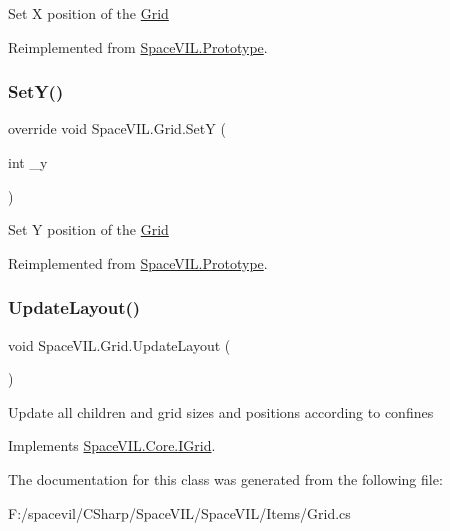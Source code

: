 Set X position of the \mbox{\hyperlink{class_space_v_i_l_1_1_grid}{Grid}} 



Reimplemented from \mbox{\hyperlink{class_space_v_i_l_1_1_prototype}{Space\+V\+I\+L.\+Prototype}}.

\mbox{\label{class_space_v_i_l_1_1_grid_a37ea23fcafda8c5fd8cc8fc41101a20d}} 
\subsubsection{\texorpdfstring{Set\+Y()}{SetY()}}
{\footnotesize\ttfamily override void Space\+V\+I\+L.\+Grid.\+SetY (\begin{DoxyParamCaption}\item[{int}]{\+\_\+y }\end{DoxyParamCaption})\hspace{0.3cm}{\ttfamily [virtual]}}



Set Y position of the \mbox{\hyperlink{class_space_v_i_l_1_1_grid}{Grid}} 



Reimplemented from \mbox{\hyperlink{class_space_v_i_l_1_1_prototype}{Space\+V\+I\+L.\+Prototype}}.

\mbox{\label{class_space_v_i_l_1_1_grid_a3cc929016738df7ef25e984338255a55}} 
\subsubsection{\texorpdfstring{Update\+Layout()}{UpdateLayout()}}
{\footnotesize\ttfamily void Space\+V\+I\+L.\+Grid.\+Update\+Layout (\begin{DoxyParamCaption}{ }\end{DoxyParamCaption})}



Update all children and grid sizes and positions according to confines 



Implements \mbox{\hyperlink{interface_space_v_i_l_1_1_core_1_1_i_grid}{Space\+V\+I\+L.\+Core.\+I\+Grid}}.



The documentation for this class was generated from the following file\+:\begin{DoxyCompactItemize}
\item 
F\+:/spacevil/\+C\+Sharp/\+Space\+V\+I\+L/\+Space\+V\+I\+L/\+Items/Grid.\+cs\end{DoxyCompactItemize}
